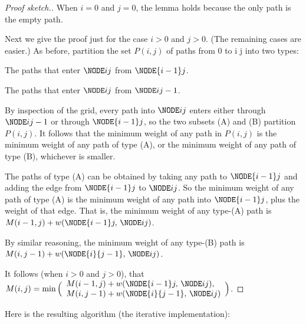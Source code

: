 \begin{proof}[Proof sketch.]
  When $i=0$ and $j=0$, the lemma holds because the only path is the empty path.

  Next we give the proof just for the case $i>0$ and $j>0$. (The remaining cases are easier.)
  As before, partition the set $P(i,j)$ of paths from  0 to \NODE i  j
  into two types:
  \begin{mylist}
  \item[(A)] The paths that enter $\NODE i j$ from $\NODE {i-1} j$.
  \item[(B)] The paths that enter  $\NODE i j$ from $\NODE i {j-1}$.
  \end{mylist}
  By inspection of the grid, every path into $\NODE i  j$
  enters either through  $\NODE i {j-1}$ or through  $\NODE {i-1} j$, 
  so the two subsets (A) and (B) partition $P(i,j)$.
  It follows that the minimum weight of any path in $P(i,j)$
  is the minimum weight of any path of type (A), 
  or the minimum weight of any path of type (B),
  whichever is smaller.
  
  The paths of type (A) can be obtained by taking any path to $\NODE {i-1} j$ and adding
  the edge from $\NODE {i-1} j$ to $\NODE i j$.
  So the minimum weight of any path of type (A) 
  is the minimum weight of any path into $\NODE {i-1} j$,
  plus the weight of that edge.
  That is, the minimum weight of any type-(A) path
  is $M(i-1, j)+ w(\NODE {i-1} j,\, \NODE i j)$. 

  By similar reasoning, the minimum weight of any type-(B) path
  is $M(i, j-1)+ w(\NODE {i} {j-1},\, \NODE i j)$.

  It follows (when $i>0$ and $j>0$), that
  \(M(i, j) = 
    \min\Big(\begin{array}{l}
      M(i-1, j)+ w(\NODE {i-1} j,\, \NODE i j), \\
      M(i, j-1)+ w(\NODE {i} {j-1},\, \NODE i j)
    \end{array}\Big)
  \).
\end{proof}

\smallskip

Here is the resulting algorithm (the iterative implementation):

\newcommand{\shortestPath}{\textsf{shortestPath}}
\newcommand{\shortestPaths}{\textsf{shortestPaths}}

